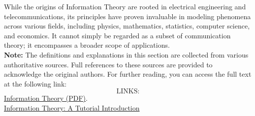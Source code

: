 \documentclass[12pt, oneside]{book}
\begin{document}
While the origins of Information Theory are rooted in electrical engineering and telecommunications, its principles have proven invaluable in modeling phenomena across various fields, including physics, mathematics, statistics, computer science, and economics. It cannot simply be regarded as a subset of communication theory; it encompasses a broader scope of applications.\vspace{0.5cm}\\
\textbf{Note:} The definitions and explanations in this section are collected from various authoritative sources. Full references to these sources are provided to acknowledge the original authors. For further reading, you can access the full text at the following link: 
\[\text{LINKS:}\]
\href{https://www.ti.rwth-aachen.de/teaching/InformationTheory/ws1819/data/InformationTheory.pdf}{Information Theory (PDF)}.\\
\href{https://arxiv.org/pdf/1802.05968}{Information Theory: A Tutorial Introduction}
\end{document}

